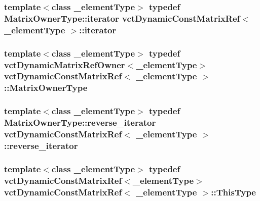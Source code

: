 \hypertarget{classvct_dynamic_const_matrix_ref_ab330f3add78ec03ac1f50861ae7d12ac}{
\subsubsection[{iterator}]{\setlength{\rightskip}{0pt plus 5cm}template$<$class \-\_\-element\-Type$>$ typedef {\bf Matrix\-Owner\-Type\-::iterator} {\bf vct\-Dynamic\-Const\-Matrix\-Ref}$<$ \-\_\-element\-Type $>$\-::{\bf iterator}}}\label{classvct_dynamic_const_matrix_ref_ab330f3add78ec03ac1f50861ae7d12ac}
\hypertarget{classvct_dynamic_const_matrix_ref_a86a40c99d49dbdb2edd71bfb82ee105b}{
\subsubsection[{Matrix\-Owner\-Type}]{\setlength{\rightskip}{0pt plus 5cm}template$<$class \-\_\-element\-Type$>$ typedef {\bf vct\-Dynamic\-Matrix\-Ref\-Owner}$<$\-\_\-element\-Type$>$ {\bf vct\-Dynamic\-Const\-Matrix\-Ref}$<$ \-\_\-element\-Type $>$\-::{\bf Matrix\-Owner\-Type}}}\label{classvct_dynamic_const_matrix_ref_a86a40c99d49dbdb2edd71bfb82ee105b}
\hypertarget{classvct_dynamic_const_matrix_ref_a05e475dde6f7edcd23536c620da182db}{
\subsubsection[{reverse\-\_\-iterator}]{\setlength{\rightskip}{0pt plus 5cm}template$<$class \-\_\-element\-Type$>$ typedef {\bf Matrix\-Owner\-Type\-::reverse\-\_\-iterator} {\bf vct\-Dynamic\-Const\-Matrix\-Ref}$<$ \-\_\-element\-Type $>$\-::{\bf reverse\-\_\-iterator}}}\label{classvct_dynamic_const_matrix_ref_a05e475dde6f7edcd23536c620da182db}
\hypertarget{classvct_dynamic_const_matrix_ref_a9c784be5ec51408ff2830ef67f2c01c8}{
\subsubsection[{This\-Type}]{\setlength{\rightskip}{0pt plus 5cm}template$<$class \-\_\-element\-Type$>$ typedef {\bf vct\-Dynamic\-Const\-Matrix\-Ref}$<$\-\_\-element\-Type$>$ {\bf vct\-Dynamic\-Const\-Matrix\-Ref}$<$ \-\_\-element\-Type $>$\-::{\bf This\-Type}}}\label{classvct_dynamic_const_matrix_ref_a9c784be5ec51408ff2830ef67f2c01c8}


